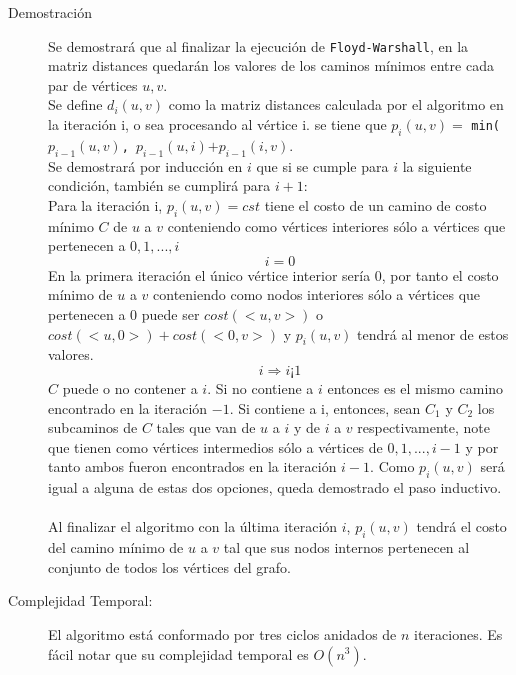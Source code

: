 \documentclass[a4paper,12pt,twocolumn]{article}
\begin{document}
	
	\begin{description}
		\item[Demostración] Se demostrará que al finalizar la ejecución de \texttt{\ttfamily Floyd-Warshall}, en la matriz distances quedarán los valores de los caminos mínimos entre cada par de vértices $u,v$.\\
		
		Se define $d_i(u, v)$ como la matriz distances calculada por el algoritmo en la iteración i, o sea procesando al vértice i. se tiene que $p_i(u,v) = $ \texttt{\ttfamily min($p_{i-1}(u,v)$, $p_{i-1}(u, i)$}$ + p_{i-1}(i, v)$.\\
		
		Se demostrará por inducción en $i$ que si se cumple para $i$ la siguiente condición, también se cumplirá para $i+1$:\\
		Para la iteración i, $p_i(u, v) = cst$ tiene el costo de un camino de costo mínimo $C$ de $u$ a $v$ conteniendo como vértices interiores sólo a vértices que pertenecen a {$0, 1, ..., i$}\\
		$$i = 0$$
		En la primera iteración el único vértice interior sería 0, por tanto el costo mínimo de $u$ a $v$ conteniendo como nodos interiores sólo a vértices que pertenecen a {$0$} puede ser $cost(<u, v>)$ o $cost(<u, 0>) + cost(<0,v>)$ y $p_i(u, v)$ tendrá al menor de estos valores.
		$$i \Rightarrow i ¡ 1$$
		$C$ puede o no contener a $i$. Si no contiene a $i$ entonces es el mismo camino encontrado en la iteración $-1$. Si contiene a i, entonces, sean $C_1$ y $C_2$ los subcaminos de $C$ tales que van de $u$ a $i$ y de $i$ a $v$ respectivamente, note que tienen como vértices intermedios sólo a vértices de {$0, 1, ..., i-1$} y por tanto ambos fueron encontrados en la iteración $i-1$. Como $p_i(u, v)$ será igual a alguna de estas dos opciones, queda demostrado el paso inductivo.\\\\
		
		
		Al finalizar el algoritmo con la última iteración $i$, $p_i(u, v)$ tendrá el costo del camino mínimo de $u$ a $v$ tal que sus nodos internos pertenecen al conjunto de todos los vértices del grafo.		
	\end{description}	
	\begin{description}
		\item [Complejidad Temporal:] El algoritmo está conformado por tres ciclos anidados de $n$ iteraciones. Es fácil notar que su complejidad temporal es $O(n^3)$.
	\end{description}
	
\end{document}
